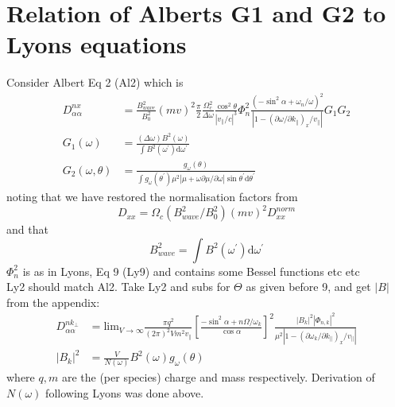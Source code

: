 \documentclass[]{article}
\begin{document}
\section{Relation of Alberts G1 and G2 to Lyons equations}
Consider Albert Eq 2 (Al2) which is
\begin{align}
D_{\alpha\alpha}^{nx} &= \frac{B_{wave}^2}{B_0^2}(mv)^2 \frac{\pi}{2}\frac{\Omega_c^2}{\Delta\omega}\frac{\cos^2\theta}{|v_\parallel/c|^3}  \Phi_n^2 \frac{(-\sin^2\alpha + \omega_n/\omega)^2}{|1-(\partial \omega/\partial k_\parallel)_x/v_\parallel |} G_1 G_2\\
G_1(\omega) &= \frac{(\Delta \omega)B^2(\omega)}{\int B^2(\omega^\prime) \mathrm{d} \omega^\prime}\\
G_2(\omega, \theta) &= \frac{g_\omega(\theta)}{\int g_\omega(\theta^\prime) \mu^2 | \mu + \omega \partial\mu/\partial\omega| \sin \theta^\prime \mathrm{d} \theta^\prime}\label{Alb_G_2}
\end{align}
noting that we have restored the normalisation factors from
\begin{equation}
D_{xx} = \Omega_c (B_{wave}^2/B_0^2)(mv)^2 D^{norm}_{xx}
\end{equation}
and that
\begin{equation}
B_{wave}^2 = \int B^2(\omega^\prime)\mathrm{d}\omega^\prime
\end{equation}
$\Phi_n^2$ is as in Lyons, Eq 9 (Ly9) and contains some Bessel functions etc etc\\
Ly2 should match Al2. Take Ly2 and subs for $\Theta$ as given before 9, and get $|B|$ from the appendix:
\begin{align}
D_{\alpha\alpha}^{nk_\perp} &= \mathrm{lim}_{V\rightarrow \infty} \frac{\pi q^2}{(2\pi)^2 V m^2 v_\parallel} \left[ \frac{-\sin^2\alpha + n \Omega/\omega_k}{\cos \alpha}\right]^2 \frac{ |B_k|^2 |\Phi_{n,k}|^2}{\mu^2 |1-(\partial \omega_k/\partial k_\parallel)_x/v_\parallel |}\\
|B_k|^2 &= \frac{V}{N(\omega)}B^2(\omega)g_\omega(\theta)
\end{align}
where $q, m$ are the (per species) charge and mass respectively. Derivation of $N(\omega)$ following Lyons was done above. 
\end{document}
